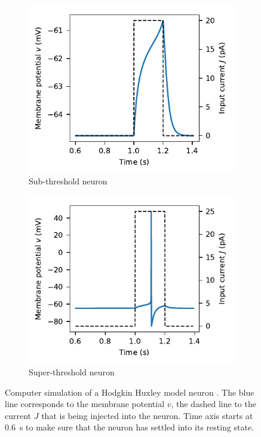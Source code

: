 \documentclass[10pt,letterpaper,oneside]{article}
\begin{document}
\begin{figure}
	\centering%
	\begin{subfigure}{0.5\textwidth}%
		\centering
		\includegraphics{media/hh_neuron_sub_threshold.pdf}%
		\caption{Sub-threshold neuron}%
		\label{fig:hh_neuron_sub_threshold}
	\end{subfigure}%
	\begin{subfigure}{0.5\textwidth}%
		\centering
		\includegraphics{media/hh_neuron_super_threshold.pdf}%
		\caption{Super-threshold neuron}%
		\label{fig:hh_neuron_super_threshold}
	\end{subfigure}%
	\caption{Computer simulation of a Hodgkin Huxley model neuron \cite{hodgkin1952quantitative,traub1991neuronal}. The blue line corresponds to the membrane potential $v$, the dashed line to the current $J$ that is being injected into the neuron. Time axis starts at \SI{0.6}{\second} to make sure that the neuron has settled into its resting state.}
\end{figure}
\end{document}
